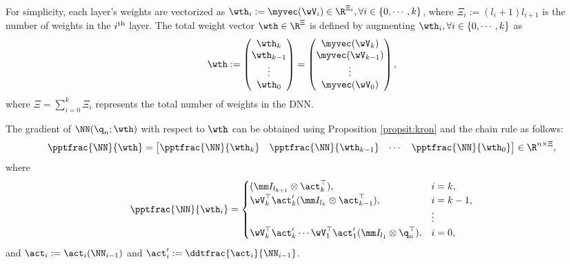 \documentclass[journal]{IEEEtran}
\begin{document}
For simplicity, each layer's weights are vectorized as $\wth_i:=\myvec(\wV_i)\in\R^{\Xi_i},\forall i\in\{0,\cdots,k\}$, where $\Xi_i:= (l_i+1)l_{i+1}$ is the number of weights in the $i\textsuperscript{th}$ layer. 
The total weight vector $\wth\in\R^{\Xi}$ is defined by augmenting $\wth_i, \forall i\in \{0,\cdots,k\}$ as 
\begin{equation}
    \wth := 
    \begin{pmatrix}
        \wth_k\\
        \wth_{k-1}\\
        \vdots\\
        \wth_0
    \end{pmatrix}
    =
    \begin{pmatrix}
        \myvec(\wV_k)\\
        \myvec(\wV_{k-1})\\
        \vdots\\
        \myvec(\wV_0)
    \end{pmatrix},
\end{equation}
where $\Xi={\sum_{i=0}^{k} \Xi_i}$ represents the total number of weights in the DNN.

The gradient of $ \NN({\q}_n;\wth)$ with respect to $\wth$ can be obtained using Proposition \ref{propsit:kron} and the chain rule as follows:
\begin{equation}
    \pptfrac{\NN}{\wth}=
    \begin{bmatrix}
        \pptfrac{\NN}{\wth_k}&
        \pptfrac{\NN}{\wth_{k-1}}&
    \cdots &
        \pptfrac{\NN}{\wth_0}
    \end{bmatrix}
    \in\R^{n \times \Xi}
    ,
    \label{eq:gradient:phi}
\end{equation}
where
\begin{equation}
    \pptfrac{\NN}{\wth_i} = 
    \begin{cases}
        (
            \mm I_{l_{k+1}}
            \otimes 
            \act_{k}^\top  
        )
        , 
        &
        i=k
        ,
        \\
        \wV_k^\top\act_{k}' 
        (
            \mm I_{l_{k}}
            \otimes  
            \act_{k-1}^\top  
        )
        , 
        & 
        i=k-1
        ,
        \\
        &
        \vdots 
        \\
        \wV_k^\top\act'_{k} 
        \cdots 
        \wV_1^\top\act_1' 
        (
            \mm I_{l_1}
            \otimes 
            {\q}_n^\top  
        )
        , 
        &
        i = 0
        ,
    \end{cases}
    \label{eq:NN:grad}
\end{equation}
and $\act_i:= \act_i(\NN_{i-1})$ and $\act_i':= \ddtfrac{\act_i}{\NN_{i-1}}$.
\end{document}
